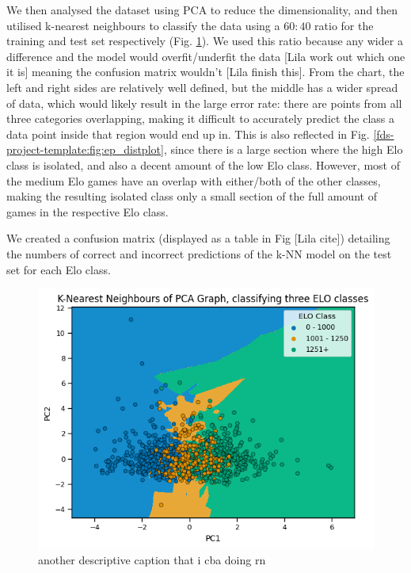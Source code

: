 \documentclass[10pt,a4paper]{article}
\begin{document}
\begin{multicols}{2}
We then analysed the dataset using PCA to reduce the dimensionality, and then utilised k-nearest neighbours to classify the data using a $60:40$ ratio for the training and test set respectively (Fig. \ref{fds-project-template:fig:knn}). We used this ratio because any wider a difference and the model would overfit/underfit the data [Lila work out which one it is] meaning the confusion matrix wouldn't [Lila finish this]. \newline
From the chart, the left and right sides are relatively well defined, but the middle has a wider spread of data, which would likely result in the large error rate: there are points from all three categories overlapping, making it difficult to accurately predict the class a data point inside that region would end up in. This is also reflected in Fig. \ref{fds-project-template:fig:ep_distplot}, since there is a large section where the high Elo class is isolated, and also a decent amount of the low Elo class. However, most of the medium Elo games have an overlap with either/both of the other classes, making the resulting isolated class only a small section of the full amount of games in the respective Elo class.\newline

We created a confusion matrix (displayed as a table in Fig [Lila cite]) detailing the numbers of correct and incorrect predictions of the k-NN model on the test set for each Elo class. 

\begin{figure}[t]
  \centering
  \includegraphics[width=\textwidth]{report/images/knn_graph.png}
  \caption{another descriptive caption that i cba doing rn}
  \label{fds-project-template:fig:knn}
\end{figure}


\end{multicols}
\end{document}
